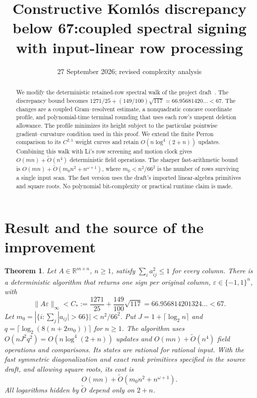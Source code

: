 \documentclass[11pt]{amsart}
\title[Constructive Koml\'os discrepancy below 67]{Constructive Koml\'os discrepancy below 67:\newline coupled spectral signing with input-linear row processing}
\author{}
\date{27 September 2026; revised complexity analysis}
\newtheorem{theorem}{Theorem}[section]
\theoremstyle{remark}\newtheorem{remark}[theorem]{Remark}
\newcommand{\R}{\mathbb R}
\newcommand{\eps}{\varepsilon}
\begin{document}
\begin{abstract}
We modify the deterministic retained-row spectral walk of the project
draft~\cite{project}. The discrepancy bound becomes
$1271/25+(149/100)\sqrt{117}=66.95681420\ldots<67$.
The changes are a coupled Gram--resolvent estimate, a nonquadratic concave
coordinate profile, and polynomial-time terminal rounding that uses each
row's unspent deletion allowance. The profile minimizes its height subject
to the particular pointwise gradient--curvature condition used in this
proof. We extend the finite Perron comparison to its $C^{2,1}$ weight
curves and retain $O(n\log^4(2+n))$ updates.
Combining this walk with Li's row screening and motion clock gives
$O(mn)+\widetilde O(n^4)$ deterministic field operations.
The sharper fast-arithmetic bound is
$O(mn)+\widetilde O(m_0n^2+n^{\omega+1})$, where
$m_0< n^2/66^2$ is the number of rows surviving a single input scan.
The fast version uses the draft's imported linear-algebra primitives and
square roots. No polynomial bit-complexity or practical runtime claim is made.
\end{abstract}
\maketitle

\section{Result and the source of the improvement}

\begin{theorem}\label{thm:main}
Let $A\in\R^{m\times n}$, $n\ge1$, satisfy $\sum_i a_{ij}^2\le1$ for every column.
There is a deterministic algorithm that returns one sign per original
column, $\eps\in\{-1,1\}^n$, with
\[
 \|A\eps\|_\infty<C_*:=\frac{1271}{25}+\frac{149}{100}\sqrt{117}
 =66.956814201324\ldots<67.
\]
Let $m_0=|\{i:\sum_j|a_{ij}|>66\}|<n^2/66^2$.
Put $J=1+\lceil\log_2 n\rceil$ and
$q=\lceil\log_2(8(n+2m_0))\rceil$ for $n\ge1$.
The algorithm uses $O(nJ^2q^2)=O(n\log^4(2+n))$ updates and
$O(mn)+\widetilde O(n^4)$ field operations and comparisons.
Its states are rational for rational input. With the fast symmetric
diagonalization and exact rank primitives specified in the source draft,
and allowing square roots, its cost is
\begin{equation}\label{eq:screenedmaincost}
 O(mn)+\widetilde O(m_0n^2+n^{\omega+1}).
\end{equation}
All logarithms hidden by $\widetilde O$ depend only on $2+n$.
\end{theorem}
\end{document}
